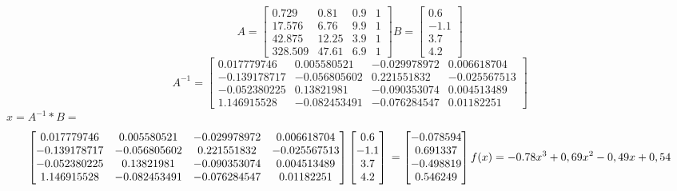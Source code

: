 \documentclass[a4paper,norsk]{article}
\begin{document}
\begin{equation*}
A = \begin{bmatrix} 0.729  & 0.81 & 0.9 & 1 \\  17.576 & 6.76 & 9.9 & 1 \\  42.875 & 12.25 & 3.9 & 1 \\  328.509 & 47.61 & 6.9 & 1 \end{bmatrix} B = \begin{bmatrix} 0.6 \\ -1.1 \\ 3.7 \\ 4.2 \end{bmatrix}\end{equation*}
\newline
\begin{equation*}
A^{-1} = \begin{bmatrix} 0.017779746 & 0.005580521 & -0.029978972 & 0.006618704 \\  -0.139178717 & -0.056805602 & 0.221551832 & -0.025567513 \\ 
 -0.052380225 & 0.13821981 & -0.090353074 & 0.004513489 \\  1.146915528 & -0.082453491 & -0.076284547 & 0.01182251 \end{bmatrix}
\end{equation*}
\newline
$x = A^{-1}*B = $
\begin{equation*}
\begin{bmatrix} 0.017779746 & 0.005580521 & -0.029978972 & 0.006618704 \\  -0.139178717 & -0.056805602 & 0.221551832 & -0.025567513 \\ 
 -0.052380225 & 0.13821981 & -0.090353074 & 0.004513489 \\  1.146915528 & -0.082453491 & -0.076284547 & 0.01182251  \end{bmatrix} \begin{bmatrix}   0.6 \\ -1.1 \\ 3.7 \\ 4.2 \end{bmatrix}
\newline
= \begin{bmatrix}  -0.078594 \\  0.691337 \\-0.498819 \\  0.546249 \end{bmatrix} 
\newline
\newline
f(x) = -0.78x^{3} + 0,69x^{2}-0,49x + 0,54
\end{equation*}
\end{document}
